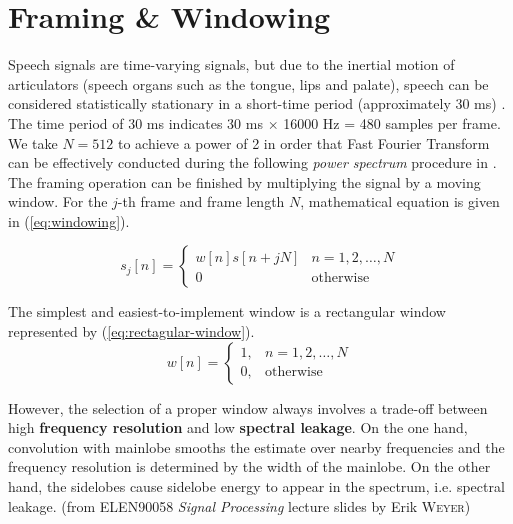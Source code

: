 
\section{Framing \& Windowing}

Speech signals are time-varying signals, but due to the inertial motion of articulators (speech organs such as the tongue, lips and palate), speech can be considered statistically stationary in a short-time period (approximately 30 ms) \cite{brandstein1995practical}. The time period of 30 ms indicates 30 ms $\times$ 16000 Hz = 480 samples per frame. We take $N = 512$ to achieve a power of 2 in order that Fast Fourier Transform can be effectively conducted during the following \textit{power spectrum} procedure in .\\

The framing operation can be finished by multiplying the signal by a moving window. For the $j$-th frame and frame length $N$, mathematical equation is given in (\ref{eq:windowing}).

\begin{equation}
\label{eq:windowing}
s_j[n] =
\begin{cases}
w[n] s[n+jN] & n = 1, 2, \dots, N\\
0 & \text{otherwise}
\end{cases}
\end{equation}

The simplest and easiest-to-implement window is a rectangular window represented by (\ref{eq:rectagular-window}).
\begin{equation}
\label{eq:rectagular-window}
w[n] =
\begin{cases}
1, & n = 1, 2, \dots, N\\
0, & \text{otherwise}
\end{cases}
\end{equation}

However, the selection of a proper window always involves a trade-off between high \textbf{frequency resolution} and low \textbf{spectral leakage}. On the one hand, convolution with mainlobe smooths the estimate over nearby frequencies and the frequency resolution is determined by the width of the mainlobe. On the other hand, the sidelobes cause sidelobe energy to appear in the spectrum, i.e. spectral leakage. (from ELEN90058 \textit{Signal Processing} lecture slides by Erik \textsc{Weyer})

